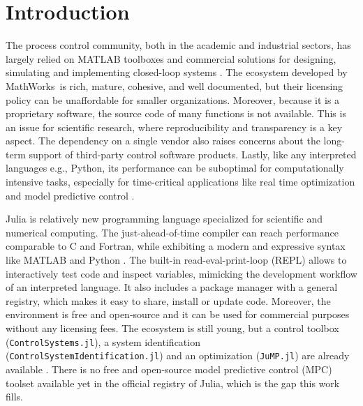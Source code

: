 \section{Introduction}

The process control community, both in the academic and industrial sectors, has largely relied on MATLAB toolboxes and commercial solutions for designing, simulating and implementing closed-loop systems \citep{optimMatlab}. The ecosystem developed by MathWorks\texttrademark\ is rich, mature, cohesive, and well documented, but their licensing policy can be unaffordable for smaller organizations. Moreover, because it is a proprietary software, the source code of many functions is not available. This is an issue for scientific research, where reproducibility and transparency is a key aspect. The dependency on a single vendor also raises concerns about the long-term support of third-party control software products. Lastly, like any interpreted languages e.g., Python, its performance can be suboptimal for computationally intensive tasks, especially for time-critical applications like real time optimization and model predictive control \citep{matlabPythonJulia, juliaML}.

Julia is relatively new programming language specialized for scientific and numerical computing. The just-ahead-of-time compiler can reach performance comparable to C and Fortran, while exhibiting a modern and expressive syntax like MATLAB and Python \citep{juliaPaper}. The built-in read-eval-print-loop (REPL) allows to interactively test code and inspect variables, mimicking the development workflow of an interpreted language. It also includes a package manager with a general registry, which makes it easy to share, install or update code. Moreover, the environment is free and open-source and it can be used for commercial purposes without any licensing fees. The ecosystem is still young, but a control toolbox (\texttt{ControlSystems.jl}), a system identification (\texttt{ControlSystemIdentification.jl}) and an optimization (\texttt{JuMP.jl}) are already available \citep{controlsystems, jump}. There is no free and open-source model predictive control (MPC) toolset available yet in the official registry of Julia, which is the gap this work fills.


